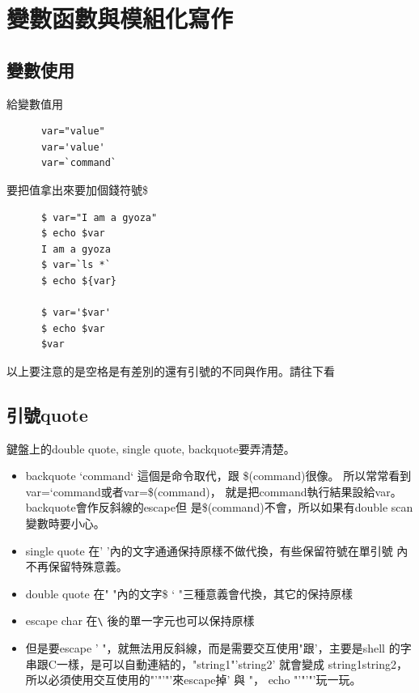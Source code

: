     \section{變數函數與模組化寫作}
    \subsection{變數使用}
    給變數值用
    \begin{verbatim}
      var="value"
      var='value'
      var=`command`
    \end{verbatim}
    要把值拿出來要加個錢符號\$
    \begin{verbatim}
      $ var="I am a gyoza"
      $ echo $var
      I am a gyoza
      $ var=`ls *`
      $ echo ${var}

      $ var='$var'
      $ echo $var
      $var
    \end{verbatim}
    以上要注意的是空格是有差別的還有引號的不同與作用。請往下看
    \subsection{引號quote}
    鍵盤上的double quote, single quote, backquote要弄清楚。
    \begin{itemize}
    \item backquote `command` 這個是命令取代，跟 \$(command)很像。
          所以常常看到var=`command或者var=\$(command)，
          就是把command執行結果設給var。backquote會作反斜線的escape但
	  是\$(command)不會，所以如果有double scan變數時要小心。
    \item single quote 在' '內的文字通通保持原樣不做代換，有些保留符號在單引號
          內不再保留特殊意義。
    \item double quote 在" "內的文字\$ ` "三種意義會代換，其它的保持原樣
    \item escape char  在\verb=\=  後的單一字元也可以保持原樣
    \item 但是要escape ' "，就無法用反斜線，而是需要交互使用"跟'，主要是shell
          的字串跟C一樣，是可以自動連結的，"string1"'string2' 就會變成
          string1string2，所以必須使用交互使用的"'"'"'來escape掉' 與 "，
          echo "'"'"'玩一玩。
    \end{itemize}
